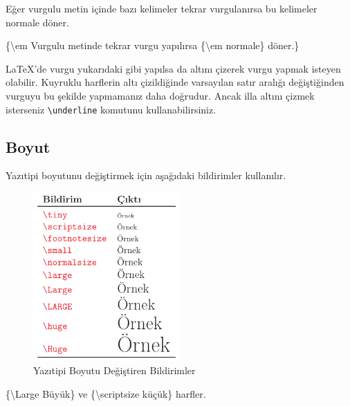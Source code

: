 \documentclass[
  letterpaper,
  DIV=11,
  numbers=noendperiod]{scrreprt}
\newenvironment{Shaded}{\begin{snugshade}}{\end{snugshade}}
\newcommand{\FunctionTok}[1]{\textcolor[rgb]{0.28,0.35,0.67}{#1}}
\newcommand{\NormalTok}[1]{\textcolor[rgb]{0.00,0.23,0.31}{#1}}
\begin{document}
Eğer vurgulu metin içinde bazı kelimeler tekrar vurgulanırsa bu
kelimeler normale döner.

\begin{Shaded}
\begin{Highlighting}[]
\NormalTok{\{}\FunctionTok{\textbackslash{}em}\NormalTok{ Vurgulu metinde tekrar}
\NormalTok{vurgu yapılırsa \{}\FunctionTok{\textbackslash{}em}\NormalTok{ normale\}}
\NormalTok{döner.\}}
\end{Highlighting}
\end{Shaded}

{\LaTeX}'de vurgu yukarıdaki gibi yapılsa da altını çizerek vurgu yapmak
isteyen olabilir. Kuyruklu harflerin altı çizildiğinde varsayılan satır
aralığı değiştiğinden vurguyu bu şekilde yapmamanız daha doğrudur. Ancak
illa altını çizmek isterseniz \texttt{\textbackslash{}underline}
komutunu kullanabilirsiniz.

\hypertarget{boyut}{%
\subsection{Boyut}\label{boyut}}

Yazıtipi boyutunu değiştirmek için aşağıdaki bildirimler kullanılır.

\begin{figure}

{\centering \includegraphics[width=0.5\textwidth,height=\textheight]{./images/yazitipi8.png}

}

\caption{Yazıtipi Boyutu Değiştiren Bildirimler}

\end{figure}

\begin{Shaded}
\begin{Highlighting}[]
\NormalTok{\{}\FunctionTok{\textbackslash{}Large}\NormalTok{ Büyük\} ve}
\NormalTok{\{}\FunctionTok{\textbackslash{}scriptsize}\NormalTok{ küçük\} harfler.}
\end{Highlighting}
\end{Shaded}
\end{document}
